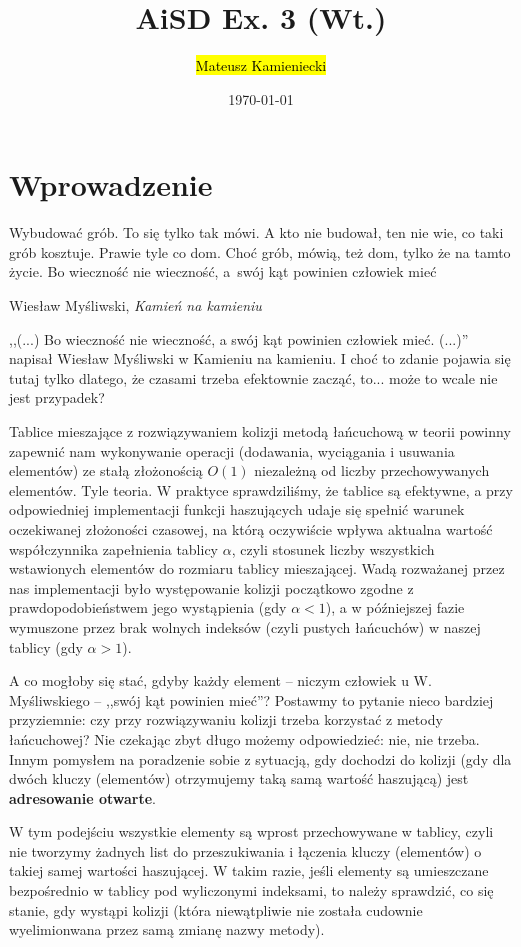 \documentclass[twoside]{article}
\title{AiSD Ex. 3 (Wt.)}
\author{\hl{Mateusz Kamieniecki}}
\date{\today}
\begin{document}
\pagestyle{fancy}
\fancyhead{}
\fancyhead[L]{\@title}
\fancyhead[R]{\@author}
\fancyhead[C]{\@date}

\cfoot{\thepage\ / \pageref{LastPage}}


\newpage

\section{Wprowadzenie}

\epigraph{
Wybudować grób.
To się tylko tak mówi.
A kto nie budował, ten nie wie, co taki grób kosztuje.
Prawie tyle co dom.
Choć grób, mówią, też dom, tylko że na tamto życie.
Bo wieczność nie wieczność, a~swój kąt powinien człowiek mieć
}{Wiesław Myśliwski, \textit{Kamień na kamieniu}}

,,(...) Bo wieczność nie wieczność, a swój kąt powinien człowiek mieć. (...)'' napisał Wiesław Myśliwski w Kamieniu na kamieniu.
I choć to zdanie pojawia się tutaj tylko dlatego, że czasami trzeba efektownie zacząć,
to... może to wcale nie jest przypadek?

Tablice mieszające z rozwiązywaniem kolizji metodą łańcuchową w teorii powinny zapewnić nam
wykonywanie operacji (dodawania, wyciągania i usuwania elementów) ze stałą złożonością $O(1)$
niezależną od liczby przechowywanych elementów.
Tyle teoria.
W praktyce sprawdziliśmy, że tablice są efektywne, a przy odpowiedniej implementacji funkcji
haszujących udaje się spełnić warunek oczekiwanej złożoności czasowej, na którą oczywiście
wpływa aktualna wartość współczynnika zapełnienia tablicy $\alpha$, czyli stosunek liczby 
wszystkich wstawionych elementów do rozmiaru tablicy mieszającej.
Wadą rozważanej przez nas implementacji było występowanie kolizji początkowo zgodne 
z prawdopodobieństwem jego wystąpienia (gdy $\alpha < 1$), a w późniejszej fazie wymuszone
przez brak wolnych indeksów (czyli pustych łańcuchów) w naszej tablicy (gdy $\alpha > 1$).

A co mogłoby się stać, gdyby każdy element -- niczym człowiek u W. Myśliwskiego -- ,,swój kąt 
powinien mieć''?
Postawmy to pytanie nieco bardziej przyziemnie: czy przy rozwiązywaniu kolizji trzeba korzystać
z metody łańcuchowej?
Nie czekając zbyt długo możemy odpowiedzieć: nie, nie trzeba.
Innym pomysłem na poradzenie sobie z sytuacją, gdy dochodzi do kolizji (gdy dla dwóch kluczy 
(elementów) otrzymujemy taką samą wartość haszującą) jest \textbf{adresowanie otwarte}.

W tym podejściu wszystkie elementy są wprost przechowywane w tablicy, czyli nie tworzymy żadnych
list do przeszukiwania i łączenia kluczy (elementów) o takiej samej wartości haszującej.
W takim razie, jeśli elementy są umieszczane bezpośrednio w tablicy pod wyliczonymi indeksami, to
należy sprawdzić, co się stanie, gdy wystąpi kolizji (która niewątpliwie nie została cudownie
wyelimionwana przez samą zmianę nazwy metody).
\end{document}
